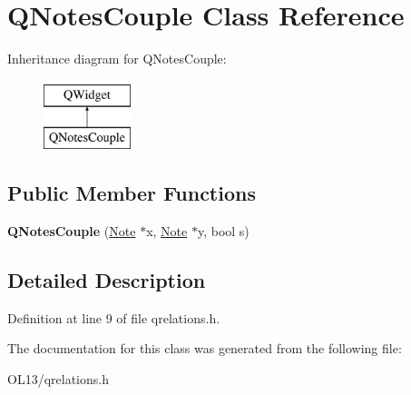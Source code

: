 \hypertarget{class_q_notes_couple}{}\section{Q\+Notes\+Couple Class Reference}
\label{class_q_notes_couple}
Inheritance diagram for Q\+Notes\+Couple\+:\begin{figure}[H]
\begin{center}
\leavevmode
\includegraphics[height=2.000000cm]{class_q_notes_couple}
\end{center}
\end{figure}
\subsection*{Public Member Functions}
\begin{DoxyCompactItemize}
\item 
\mbox{\label{class_q_notes_couple_a010fab55fb622f8959510ad50ff34502}} 
{\bfseries Q\+Notes\+Couple} (\hyperlink{class_note}{Note} $\ast$x, \hyperlink{class_note}{Note} $\ast$y, bool s)
\end{DoxyCompactItemize}


\subsection{Detailed Description}


Definition at line 9 of file qrelations.\+h.



The documentation for this class was generated from the following file\+:\begin{DoxyCompactItemize}
\item 
O\+L13/qrelations.\+h\end{DoxyCompactItemize}
